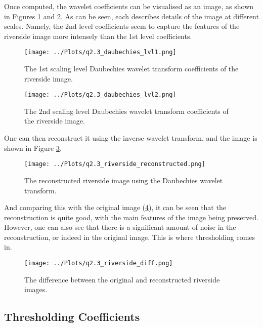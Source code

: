 \documentclass[12pt]{report} %
\begin{document}
Once computed, the wavelet coefficients can be visualised as an image, as shown in Figures \ref{fig:wavelet_coefficients} and \ref{fig:wavelet_coefficients2}. As can be seen, each describes details of the image at different scales. Namely, the 2nd level coefficients seem to capture the features of the riverside image more intensely than the 1st level coefficients.

\begin{figure}[htbp]
    \centering
    \texttt{[image: ../Plots/q2.3\_daubechies\_lvl1.png]}
    \caption{The 1st scaling level Daubechies wavelet transform coefficients of the riverside image.}
    \label{fig:wavelet_coefficients}
\end{figure}

\begin{figure}[htbp]
    \centering
    \texttt{[image: ../Plots/q2.3\_daubechies\_lvl2.png]}
    \caption{The 2nd scaling level Daubechies wavelet transform coefficients of the riverside image.}
    \label{fig:wavelet_coefficients2}
\end{figure}

One can then reconstruct it using the inverse wavelet transform, and the image is shown in Figure \ref{fig:reconstructed_image}.

\begin{figure}[htbp]
    \centering
    \texttt{[image: ../Plots/q2.3\_riverside\_reconstructed.png]}
    \caption{The reconstructed riverside image using the Daubechies wavelet transform.}
    \label{fig:reconstructed_image}
\end{figure}

And comparing this with the original image (\ref{fig:diff_image}), it can be seen that the reconstruction is quite good, with the main features of the image being preserved. However, one can also see that there is a significant amount of noise in the reconstruction, or indeed in the original image. This is where thresholding comes in.

\begin{figure}[htbp]
    \centering
    \texttt{[image: ../Plots/q2.3\_riverside\_diff.png]}
    \caption{The difference between the original and reconstructed riverside images.}
    \label{fig:diff_image}
\end{figure}

\subsection{Thresholding Coefficients}
\end{document}
